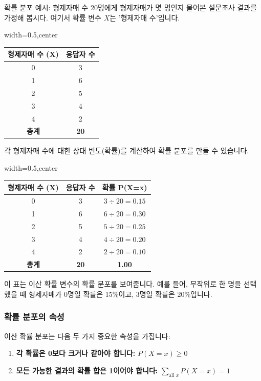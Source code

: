 \documentclass[11pt,a4paper]{article}
\begin{document}
\begin{examplebox}{확률 분포 예시: 형제자매 수}
20명에게 형제자매가 몇 명인지 물어본 설문조사 결과를 가정해 봅시다. 여기서 확률 변수 \(X\)는 '형제자매 수'입니다.

\begin{adjustbox}{width=0.5\textwidth,center}
\begin{tabular}{cc}
\toprule
\textbf{형제자매 수 (X)} & \textbf{응답자 수} \\
\midrule
0 & 3 \\
1 & 6 \\
2 & 5 \\
3 & 4 \\
4 & 2 \\
\midrule
\textbf{총계} & \textbf{20} \\
\bottomrule
\end{tabular}
\end{adjustbox}

각 형제자매 수에 대한 상대 빈도(확률)를 계산하여 확률 분포를 만들 수 있습니다.

\begin{adjustbox}{width=0.5\textwidth,center}
\begin{tabular}{ccc}
\toprule
\textbf{형제자매 수 (X)} & \textbf{응답자 수} & \textbf{확률 P(X=x)} \\
\midrule
0 & 3 & \(3 \div 20 = 0.15\) \\
1 & 6 & \(6 \div 20 = 0.30\) \\
2 & 5 & \(5 \div 20 = 0.25\) \\
3 & 4 & \(4 \div 20 = 0.20\) \\
4 & 2 & \(2 \div 20 = 0.10\) \\
\midrule
\textbf{총계} & \textbf{20} & \textbf{1.00} \\
\bottomrule
\end{tabular}
\end{adjustbox}

이 표는 이산 확률 변수의 확률 분포를 보여줍니다. 예를 들어, 무작위로 한 명을 선택했을 때 형제자매가 0명일 확률은 15\%이고, 3명일 확률은 20\%입니다.
\end{examplebox}

\subsubsection*{확률 분포의 속성}
이산 확률 분포는 다음 두 가지 중요한 속성을 가집니다:
\begin{enumerate}
    \item \textbf{각 확률은 0보다 크거나 같아야 합니다:} \(P(X=x) \ge 0\)
    \item \textbf{모든 가능한 결과의 확률 합은 1이어야 합니다:} \( \sum_{\text{all } x} P(X=x) = 1 \)
\end{enumerate}
\end{document}
